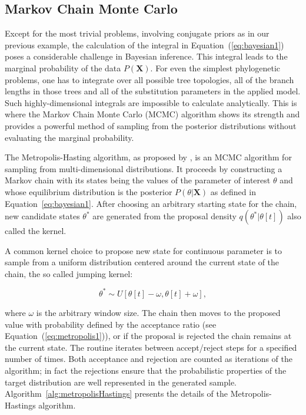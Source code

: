 \subsection{Markov Chain Monte Carlo\label{sub:MCMC}}

Except for the most trivial problems, involving conjugate priors as in our previous example, the calculation of the integral in Equation~(\ref{eq:bayesian1}) poses a considerable challenge in Bayesian inference.
This integral leads to the marginal probability of the data $P\left(\mathbf{X}\right)$. 
For even the simplest phylogenetic problems, one has to integrate over all possible tree topologies, all of the branch lengths in those trees and all of the substitution parameters in the applied model.
Such highly-dimensional integrals are impossible to calculate analytically.
This is where the Markov Chain Monte Carlo (MCMC) algorithm shows its strength and provides a powerful method of sampling from the posterior distributions without evaluating the marginal probability. %

The Metropolis-Hasting algorithm, as proposed by \citet{Metropolis1953}, is an MCMC algorithm for sampling from multi-dimensional distributions.
It proceeds by constructing a Markov chain with its states being the values of the parameter of interest $\theta$ and whose equilibrium distribution is the posterior $P\left(\theta|\mathbf{X}\right)$ as defined in Equation~\ref{eq:bayesian1}.
After choosing an arbitrary starting state for the chain, new candidate states $\theta^{*}$ are generated from the proposal density $q(\theta^{*} | \theta[t])$ also called the kernel.

A common kernel choice to propose new state for continuous parameter is to sample from a uniform distribution centered around the current state of the chain, the so called jumping kernel: %

$$\theta^{*}\sim U\left[\theta[t]-\omega,\theta[t]+\omega\right],$$

\noindent
where $\omega$ is the arbitrary window size.
The chain then moves to the proposed value with probability defined by the acceptance ratio (see Equation~(\ref{eq:metropolis1})), or if the proposal is rejected the chain remains at the current state.
The routine iterates between accept/reject steps for a specified number of times.
Both acceptance and rejection are counted as iterations of the algorithm; in fact the rejections ensure that the probabilistic properties of the target distribution are well represented in the generated sample.  
Algorithm~\ref{alg:metropolisHastings} presents the details of the Metropolis-Hastings algorithm.

